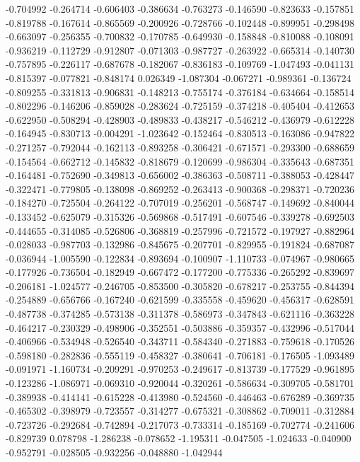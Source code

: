 -0.704992
-0.264714
-0.606403
-0.386634
-0.763273
-0.146590
-0.823633
-0.157851
-0.819788
-0.167614
-0.865569
-0.200926
-0.728766
-0.102448
-0.899951
-0.298498
-0.663097
-0.256355
-0.700832
-0.170785
-0.649930
-0.158848
-0.810088
-0.108091
-0.936219
-0.112729
-0.912807
-0.071303
-0.987727
-0.263922
-0.665314
-0.140730
-0.757895
-0.226117
-0.687678
-0.182067
-0.836183
-0.109769
-1.047493
-0.041131
-0.815397
-0.077821
-0.848174
0.026349
-1.087304
-0.067271
-0.989361
-0.136724
-0.809255
-0.331813
-0.906831
-0.148213
-0.755174
-0.376184
-0.634664
-0.158514
-0.802296
-0.146206
-0.859028
-0.283624
-0.725159
-0.374218
-0.405404
-0.412653
-0.622950
-0.508294
-0.428903
-0.489833
-0.438217
-0.546212
-0.436979
-0.612228
-0.164945
-0.830713
-0.004291
-1.023642
-0.152464
-0.830513
-0.163086
-0.947822
-0.271257
-0.792044
-0.162113
-0.893258
-0.306421
-0.671571
-0.293300
-0.688659
-0.154564
-0.662712
-0.145832
-0.818679
-0.120699
-0.986304
-0.335643
-0.687351
-0.164481
-0.752690
-0.349813
-0.656002
-0.386363
-0.508711
-0.388053
-0.428447
-0.322471
-0.779805
-0.138098
-0.869252
-0.263413
-0.900368
-0.298371
-0.720236
-0.184270
-0.725504
-0.264122
-0.707019
-0.256201
-0.568747
-0.149692
-0.840044
-0.133452
-0.625079
-0.315326
-0.569868
-0.517491
-0.607546
-0.339278
-0.692503
-0.444655
-0.314085
-0.526806
-0.368819
-0.257996
-0.721572
-0.197927
-0.882964
-0.028033
-0.987703
-0.132986
-0.845675
-0.207701
-0.829955
-0.191824
-0.687087
-0.036944
-1.005590
-0.122834
-0.893694
-0.100907
-1.110733
-0.074967
-0.980665
-0.177926
-0.736504
-0.182949
-0.667472
-0.177200
-0.775336
-0.265292
-0.839697
-0.206181
-1.024577
-0.246705
-0.853500
-0.305820
-0.678217
-0.253755
-0.844394
-0.254889
-0.656766
-0.167240
-0.621599
-0.335558
-0.459620
-0.456317
-0.628591
-0.487738
-0.374285
-0.573138
-0.311378
-0.586973
-0.347843
-0.621116
-0.363228
-0.464217
-0.230329
-0.498906
-0.352551
-0.503886
-0.359357
-0.432996
-0.517044
-0.406966
-0.534948
-0.526540
-0.343711
-0.584340
-0.271883
-0.759618
-0.170526
-0.598180
-0.282836
-0.555119
-0.458327
-0.380641
-0.706181
-0.176505
-1.093489
-0.091971
-1.160734
-0.209291
-0.970253
-0.249617
-0.813739
-0.177529
-0.961895
-0.123286
-1.086971
-0.069310
-0.920044
-0.320261
-0.586634
-0.309705
-0.581701
-0.389938
-0.414141
-0.615228
-0.413980
-0.524560
-0.446463
-0.676289
-0.369735
-0.465302
-0.398979
-0.723557
-0.314277
-0.675321
-0.308862
-0.709011
-0.312884
-0.723726
-0.292684
-0.742894
-0.217073
-0.733314
-0.185169
-0.702774
-0.241606
-0.829739
0.078798
-1.286238
-0.078652
-1.195311
-0.047505
-1.024633
-0.040900
-0.952791
-0.028505
-0.932256
-0.048880
-1.042944
